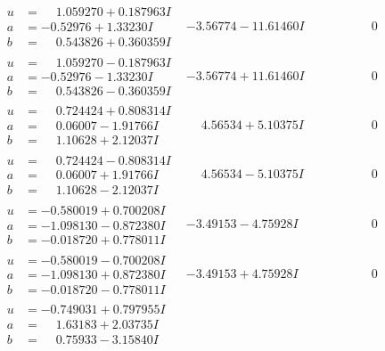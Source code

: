 \documentclass[1p]{elsarticle_modified}
\theoremstyle{definition}
\begin{document}
$$\begin{array}{c|c|c}
\begin{aligned}
u &= \phantom{-}1.059270 + 0.187963 I \\
a &= -0.52976 + 1.33230 I \\
b &= \phantom{-}0.543826 + 0.360359 I\end{aligned}
 & -3.56774 - 11.61460 I & \phantom{-0.000000 } 0 \\ \hline\begin{aligned}
u &= \phantom{-}1.059270 - 0.187963 I \\
a &= -0.52976 - 1.33230 I \\
b &= \phantom{-}0.543826 - 0.360359 I\end{aligned}
 & -3.56774 + 11.61460 I & \phantom{-0.000000 } 0 \\ \hline\begin{aligned}
u &= \phantom{-}0.724424 + 0.808314 I \\
a &= \phantom{-}0.06007 - 1.91766 I \\
b &= \phantom{-}1.10628 + 2.12037 I\end{aligned}
 & \phantom{-}4.56534 + 5.10375 I & \phantom{-0.000000 } 0 \\ \hline\begin{aligned}
u &= \phantom{-}0.724424 - 0.808314 I \\
a &= \phantom{-}0.06007 + 1.91766 I \\
b &= \phantom{-}1.10628 - 2.12037 I\end{aligned}
 & \phantom{-}4.56534 - 5.10375 I & \phantom{-0.000000 } 0 \\ \hline\begin{aligned}
u &= -0.580019 + 0.700208 I \\
a &= -1.098130 - 0.872380 I \\
b &= -0.018720 + 0.778011 I\end{aligned}
 & -3.49153 - 4.75928 I & \phantom{-0.000000 } 0 \\ \hline\begin{aligned}
u &= -0.580019 - 0.700208 I \\
a &= -1.098130 + 0.872380 I \\
b &= -0.018720 - 0.778011 I\end{aligned}
 & -3.49153 + 4.75928 I & \phantom{-0.000000 } 0 \\ \hline\begin{aligned}
u &= -0.749031 + 0.797955 I \\
a &= \phantom{-}1.63183 + 2.03735 I \\
b &= \phantom{-}0.75933 - 3.15840 I\end{aligned}

\end{array}$$
\end{document}
